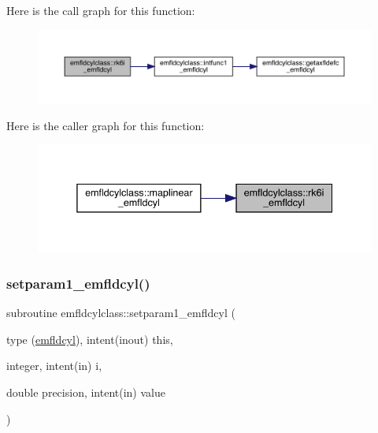 Here is the call graph for this function\+:\nopagebreak
\begin{figure}[H]
\begin{center}
\leavevmode
\includegraphics[width=350pt]{namespaceemfldcylclass_a9bd0c565261b617a6860bb5ae288b486_cgraph}
\end{center}
\end{figure}
Here is the caller graph for this function\+:\nopagebreak
\begin{figure}[H]
\begin{center}
\leavevmode
\includegraphics[width=338pt]{namespaceemfldcylclass_a9bd0c565261b617a6860bb5ae288b486_icgraph}
\end{center}
\end{figure}
\mbox{\label{namespaceemfldcylclass_a8d9d8db5c093803ef59ad5bc4873e745}} 
\subsubsection{\texorpdfstring{setparam1\_emfldcyl()}{setparam1\_emfldcyl()}}
{\footnotesize\ttfamily subroutine emfldcylclass\+::setparam1\+\_\+emfldcyl (\begin{DoxyParamCaption}\item[{type (\mbox{\hyperlink{namespaceemfldcylclass_structemfldcylclass_1_1emfldcyl}{emfldcyl}}), intent(inout)}]{this,  }\item[{integer, intent(in)}]{i,  }\item[{double precision, intent(in)}]{value }\end{DoxyParamCaption})}

\mbox{\label{namespaceemfldcylclass_a5ea9bb43c35afba9da054ba9d06a691c}} 
